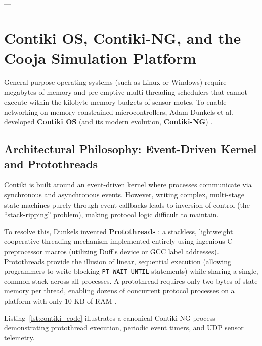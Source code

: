 ---

\section{Contiki OS, Contiki-NG, and the Cooja Simulation Platform}
\label{sec:contiki_cooja}

General-purpose operating systems (such as Linux or Windows) require megabytes of memory and pre-emptive multi-threading schedulers that cannot execute within the kilobyte memory budgets of sensor motes. To enable networking on memory-constrained microcontrollers, Adam Dunkels et al. developed \textbf{Contiki OS} (and its modern evolution, \textbf{Contiki-NG}) \cite{dunkels2004contiki}.

\subsection{Architectural Philosophy: Event-Driven Kernel and Protothreads}
Contiki is built around an event-driven kernel where processes communicate via synchronous and asynchronous events. However, writing complex, multi-stage state machines purely through event callbacks leads to inversion of control (the ``stack-ripping'' problem), making protocol logic difficult to maintain.

To resolve this, Dunkels invented \textbf{Protothreads} \cite{dunkels2006protothreads}: a stackless, lightweight cooperative threading mechanism implemented entirely using ingenious C preprocessor macros (utilizing Duff's device or GCC label addresses). Protothreads provide the illusion of linear, sequential execution (allowing programmers to write blocking \texttt{PT\_WAIT\_UNTIL} statements) while sharing a single, common stack across all processes. A protothread requires only two bytes of state memory per thread, enabling dozens of concurrent protocol processes on a platform with only $10\text{~KB}$ of RAM \cite{dunkels2006protothreads}.

Listing~\ref{lst:contiki_code} illustrates a canonical Contiki-NG process demonstrating protothread execution, periodic event timers, and UDP sensor telemetry.

